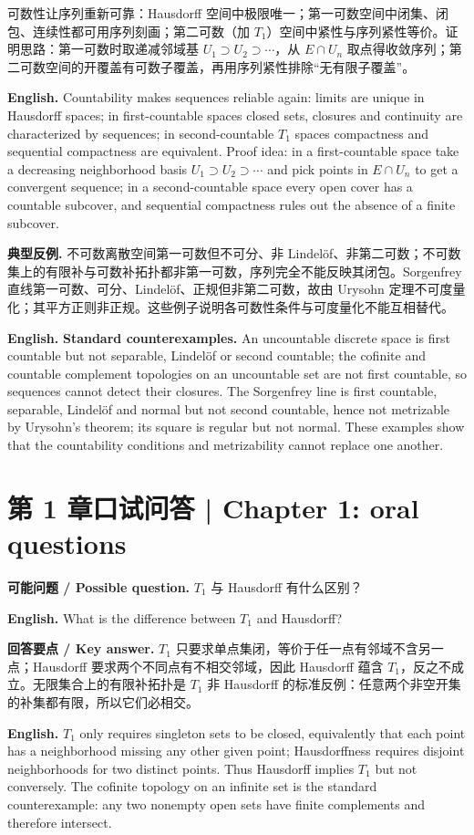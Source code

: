\documentclass[UTF8,11pt,a4paper]{ctexart}
\newcommand{\EN}[1]{\par\noindent\textbf{English.} #1\par}
\newcommand{\ASK}[4]{\par\noindent\textbf{可能问题 / Possible question.} #1\par\EN{#2}\noindent\textbf{回答要点 / Key answer.} #3\par\EN{#4}\medskip}
\begin{document}
\noindent 可数性让序列重新可靠：Hausdorff 空间中极限唯一；第一可数空间中闭集、闭包、连续性都可用序列刻画；第二可数（加 $T_1$）空间中紧性与序列紧性等价。证明思路：第一可数时取递减邻域基 $U_1\supset U_2\supset\cdots$，从 $E\cap U_n$ 取点得收敛序列；第二可数空间的开覆盖有可数子覆盖，再用序列紧性排除“无有限子覆盖”。
\EN{Countability makes sequences reliable again: limits are unique in Hausdorff spaces; in first-countable spaces closed sets, closures and continuity are characterized by sequences; in second-countable $T_1$ spaces compactness and sequential compactness are equivalent. Proof idea: in a first-countable space take a decreasing neighborhood basis $U_1\supset U_2\supset\cdots$ and pick points in $E\cap U_n$ to get a convergent sequence; in a second-countable space every open cover has a countable subcover, and sequential compactness rules out the absence of a finite subcover.}

\noindent\textbf{典型反例.} 不可数离散空间第一可数但不可分、非 Lindel\"of、非第二可数；不可数集上的有限补与可数补拓扑都非第一可数，序列完全不能反映其闭包。Sorgenfrey 直线第一可数、可分、Lindel\"of、正规但非第二可数，故由 Urysohn 定理不可度量化；其平方正则非正规。这些例子说明各可数性条件与可度量化不能互相替代。
\EN{\textbf{Standard counterexamples.} An uncountable discrete space is first countable but not separable, Lindel\"of or second countable; the cofinite and countable complement topologies on an uncountable set are not first countable, so sequences cannot detect their closures. The Sorgenfrey line is first countable, separable, Lindel\"of and normal but not second countable, hence not metrizable by Urysohn's theorem; its square is regular but not normal. These examples show that the countability conditions and metrizability cannot replace one another.}

\section*{第 1 章口试问答 | Chapter 1: oral questions}
\ASK{$T_1$ 与 Hausdorff 有什么区别？}{What is the difference between $T_1$ and Hausdorff?}{$T_1$ 只要求单点集闭，等价于任一点有邻域不含另一点；Hausdorff 要求两个不同点有不相交邻域，因此 Hausdorff 蕴含 $T_1$，反之不成立。无限集合上的有限补拓扑是 $T_1$ 非 Hausdorff 的标准反例：任意两个非空开集的补集都有限，所以它们必相交。}{$T_1$ only requires singleton sets to be closed, equivalently that each point has a neighborhood missing any other given point; Hausdorffness requires disjoint neighborhoods for two distinct points. Thus Hausdorff implies $T_1$ but not conversely. The cofinite topology on an infinite set is the standard counterexample: any two nonempty open sets have finite complements and therefore intersect.}
\end{document}
